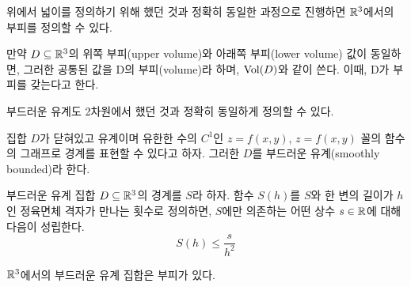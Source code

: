 위에서 넓이를 정의하기 위해 했던 것과 정확히 동일한 과정으로 진행하면 $\mathbb{R}^3$에서의 부피를 정의할 수 있다.
\begin{definition}[부피]
만약 $D\subseteq\mathbb{R}^3$의 위쪽 부피(upper volume)와 아래쪽 부피(lower volume) 값이 동일하면, 그러한 공통된 값을 D의 부피(volume)라 하며, $\mathrm{Vol}(D)$와 같이 쓴다. 이때, D가 부피를 갖는다고 한다.
\end{definition}
부드러운 유계도 2차원에서 했던 것과 정확히 동일하게 정의할 수 있다.
\begin{definition}
집합 $D$가 닫혀있고 유계이며 유한한 수의 $C^1$인 $z=f(x,y)$, $z=f(x,y)$ 꼴의 함수의 그래프로 경계를 표현할 수 있다고 하자. 그러한 $D$를 부드러운 유계(smoothly bounded)라 한다.
\end{definition}
\begin{theorem}
부드러운 유계 집합 $D\subseteq\mathbb{R}^3$의 경계를 $S$라 하자. 함수 $S(h)$를 $S$와 한 변의 길이가 $h$인 정육면체 격자가 만나는 횟수로 정의하면, $S$에만 의존하는 어떤 상수 $s\in\mathbb{R}$에 대해 다음이 성립한다.
$$
S(h)\le\frac{s}{h^2}
$$
\end{theorem}
\begin{theorem}
$\mathbb{R}^3$에서의 부드러운 유계 집합은 부피가 있다.
\end{theorem}

